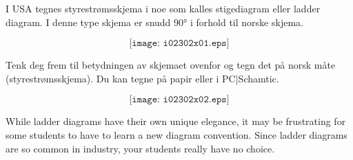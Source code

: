 

I USA tegnes styrestrømsskjema i noe som kalles stigediagram eller ladder diagram. I denne type skjema er snudd 90° i forhold til norske skjema. 

$$\texttt{[image: i02302x01.eps]}$$

Tenk deg frem til betydningen av skjemaet ovenfor og tegn det på norsk måte (styrestrømsskjema). Du kan tegne på papir eller i PC|Schamtic. 








$$\texttt{[image: i02302x02.eps]}$$







While ladder diagrams have their own unique elegance, it may be frustrating for some students to have to learn a new diagram convention.  Since ladder diagrams are so common in industry, your students really have no choice.




